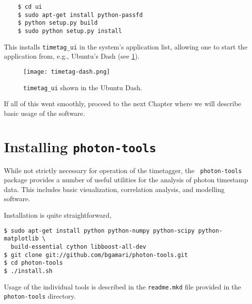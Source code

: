 \begin{verbatim}
    $ cd ui
    $ sudo apt-get install python-passfd
    $ python setup.py build
    $ sudo python setup.py install
\end{verbatim}

This installs {\tt timetag\_ui} in the system's application list,
allowing one to start the application from, e.g., Ubuntu's Dash (see
\ref{Fig:Dash}).

\begin{figure}
  \center
  \texttt{[image: timetag-dash.png]}
  \caption{{\tt timetag\_ui} shown in the Ubuntu Dash.}
  \label{Fig:Dash}
\end{figure}

If all of this went smoothly, proceed to the next Chapter where we
will describe basic usage of the software.

\section{Installing {\tt photon-tools}}
\label{Sec:InstallingPhotonTools}

While not strictly necessary for operation of the timetagger, the {\tt
photon-tools} package provides a number of useful utilities for the
analysis of photon timestamp data. This includes basic visualization,
correlation analysis, and modelling software.

Installation is quite straightforward,

\begin{verbatim}
$ sudo apt-get install python python-numpy python-scipy python-matplotlib \
  build-essential cython libboost-all-dev
$ git clone git://github.com/bgamari/photon-tools.git
$ cd photon-tools
$ ./install.sh
\end{verbatim}

Usage of the individual tools is described in the {\tt readme.mkd}
file provided in the {\tt photon-tools} directory.
